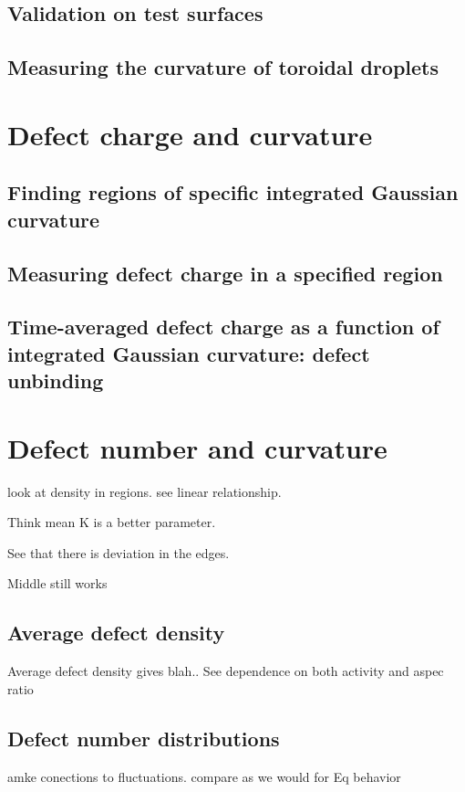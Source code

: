 \subsection{Validation on test surfaces}
\subsection{Measuring the curvature of toroidal droplets}

\section{Defect charge and curvature}
\subsection{Finding regions of specific integrated Gaussian curvature}
\subsection{Measuring defect charge in a specified region}
\subsection{Time-averaged defect charge as a function of integrated Gaussian curvature: defect unbinding}

\section{Defect number and curvature}
look at density in regions. see linear relationship.

Think mean K is a better parameter.

See that there is deviation in the edges.

Middle still works

\subsection{Average defect density}

Average defect density gives blah..
See dependence on both activity and aspec ratio
\subsection{Defect number distributions}

amke conections to fluctuations. compare as we would for Eq behavior

